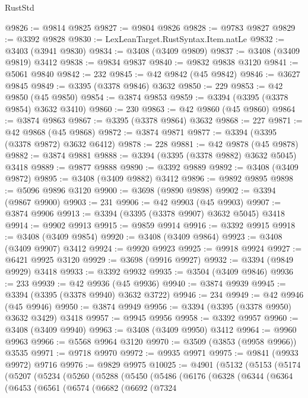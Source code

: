 \begin{lexlean}{RustStd}
\begin{coremodule}
@9826 := @9814 @9825
@9827 := @9804 @9826
@9828 := @9783 @9827
@9829 := @3392 @9828
@9830 := LexLeanTarget.RustSyntax.Item.natLe
@9832 := @3403 (@3941 @9830)
@9834 := @3408 (@3409 @9809)
@9837 := @3408 (@3409 @9819) @3412
@9838 := @9834 @9837
@9840 := @9832 @9838 @3120
@9841 := @5061 @9840
@9842 := 232
@9845 := @42 @9842 (@45 @9842)
@9846 := @3627 @9845
@9849 := @3395 (@3378 @9846) @3632
@9850 := 229
@9853 := @42 @9850 (@45 @9850)
@9854 := @3874 @9853
@9859 := @3394 (@3395 (@3378 @9854) @3632 @3410)
@9860 := 230
@9863 := @42 @9860 (@45 @9860)
@9864 := @3874 @9863
@9867 := @3395 (@3378 @9864) @3632
@9868 := 227
@9871 := @42 @9868 (@45 @9868)
@9872 := @3874 @9871
@9877 := @3394 (@3395 (@3378 @9872) @3632 @6412)
@9878 := 228
@9881 := @42 @9878 (@45 @9878)
@9882 := @3874 @9881
@9888 := @3394 (@3395 (@3378 @9882) @3632 @5045) @3418
@9889 := @9877 @9888
@9890 := @3392 @9889
@9892 := @3408 (@3409 @9872)
@9895 := @3408 (@3409 @9882) @3412
@9896 := @9892 @9895
@9898 := @5096 @9896 @3120
@9900 := @3698 (@9890 @9898)
@9902 := @3394 (@9867 @9900)
@9903 := 231
@9906 := @42 @9903 (@45 @9903)
@9907 := @3874 @9906
@9913 := @3394 (@3395 (@3378 @9907) @3632 @5045) @3418
@9914 := @9902 @9913
@9915 := @9859 @9914
@9916 := @3392 @9915
@9918 := @3408 (@3409 @9854)
@9920 := @3408 (@3409 @9864)
@9923 := @3408 (@3409 @9907) @3412
@9924 := @9920 @9923
@9925 := @9918 @9924
@9927 := @6421 @9925 @3120
@9929 := @3698 (@9916 @9927)
@9932 := @3394 (@9849 @9929) @3418
@9933 := @3392 @9932
@9935 := @3504 (@3409 @9846)
@9936 := 233
@9939 := @42 @9936 (@45 @9936)
@9940 := @3874 @9939
@9945 := @3394 (@3395 (@3378 @9940) @3632 @3722)
@9946 := 234
@9949 := @42 @9946 (@45 @9946)
@9950 := @3874 @9949
@9956 := @3394 (@3395 (@3378 @9950) @3632 @3429) @3418
@9957 := @9945 @9956
@9958 := @3392 @9957
@9960 := @3408 (@3409 @9940)
@9963 := @3408 (@3409 @9950) @3412
@9964 := @9960 @9963
@9966 := @5568 @9964 @3120
@9970 := @3509 (@3853 (@9958 @9966)) @3535
@9971 := @9718 @9970
@9972 := @9935 @9971
@9975 := @9841 (@9933 @9972) @9716
@9976 := @9829 @9975
@10025 := @4901
    (@5132
      (@5153
        (@5174
          (@5207
            (@5234
              (@5260
                (@5288
                  (@5450
                    (@5486
                      (@6176
                        (@6328
                          (@6344
                            (@6364
                              (@6453
                                (@6561
                                  (@6574
                                    (@6682
                                      (@6692
                                        (@7324

\end{coremodule}
\end{lexlean}
